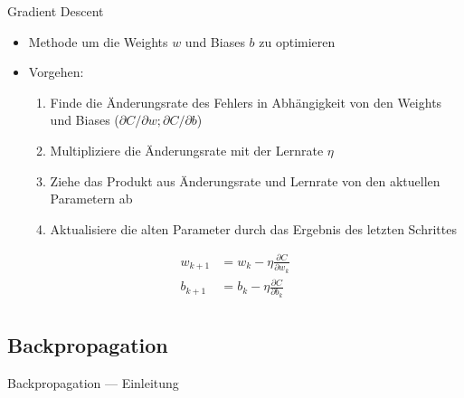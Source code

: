 \begin{frame}{Gradient Descent}
  \begin{itemize}
  \item Methode um die Weights \(w\) und Biases \(b\) zu optimieren
  \item Vorgehen: \pause
    \begin{enumerate}
    \item Finde die Änderungsrate des Fehlers in Abhängigkeit von den Weights und Biases (\(\partial C / \partial w; \partial C / \partial b\))\pause
    \item Multipliziere die Änderungsrate mit der Lernrate \(\eta\)\pause
    \item Ziehe das Produkt aus Änderungsrate und Lernrate von den aktuellen Parametern ab\pause
    \item Aktualisiere die alten Parameter durch das Ergebnis des letzten Schrittes
    \end{enumerate}
  \end{itemize}

  \begin{align*}
    w_{k+1} &= w_{k} - \eta \frac{\partial C}{\partial w_{k}}\\[1em]
    b_{k+1} &= b_{k} - \eta \frac{\partial C}{\partial b_{k}}\\
  \end{align*}
\end{frame}

\subsection{Backpropagation}%
\label{sec:backprop}

\begin{frame}{Backpropagation --- Einleitung}


  
\end{frame}

